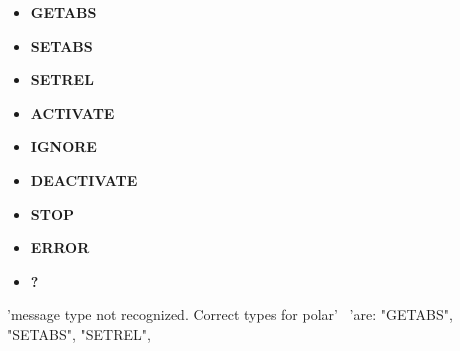 \documentclass[12pt]{report}
\begin{document}
	\begin{itemize}
	
			\item[] {\bf{GETABS}}
			\subitem{-----}
			
		\item[] {\bf{SETABS}}
			\subitem{-----}

		\item[] {\bf{SETREL}}
			\subitem{-----}
					
		\item[] {\bf{ACTIVATE}}
			
		\item[] {\bf{IGNORE}}
			\subitem{-----}
				
		\item[] {\bf{DEACTIVATE}}

		\item[] {\bf{STOP}}

		\item[] {\bf{ERROR}}

		\item[] {\bf{?}}
\end{itemize}
'message type not recognized. Correct types for polar' \
                       'are: "GETABS", "SETABS", "SETREL", 

\iffalse
 elif "DEACTIVATE" in subcommand:
            logging.debug("Hexapod deactivation command given")
            self.mtcommand_client.deactivate_hxpd()
        elif "ACTIVATE" in subcommand:
            logging.debug("Hexapod activation command given")
            self.mtcommand_client.activate_hxpd()
        elif "STOP" in subcommand:
            logging.debug("Hexapod stop command given")
            self.mtcommand_client.stop_hxpd()
        elif "INTERLOCK" in subcommand:
            logging.debug("Hexapod interlock command given")
            self.mtcommand_client.interlock_hxpd()
        elif "ERROR" in subcommand:
            logging.debug("Hexapod acknowledge error command given")
            self.mtcommand_client.acknowledge_error_on_hxpd()
        elif "?" in subcommand:
            self.msg = 'Usable types for hexapod are: "GETABS", "SETABS", ' \
                       '"SETREL", "ACTIVATE", "DEACTIVATE", ' \
                       '"STOP", "INTERLOCK", "ERROR".'
\fi
\end{document}

